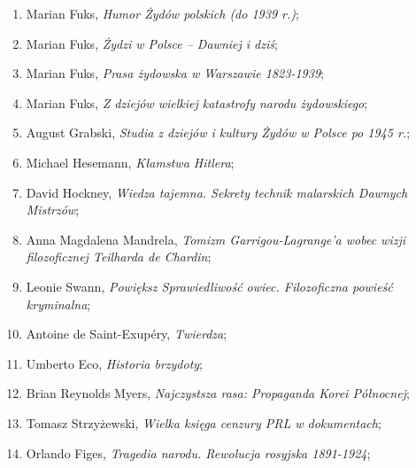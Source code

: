 \documentclass[a4paper,11pt]{article}
\begin{document}
\begin{enumerate}
\item Marian Fuks, \textit{Humor Żydów polskich (do 1939 r.)};



\item Marian Fuks, \textit{Żydzi w Polsce – Dawniej i dziś};



\item Marian Fuks, \textit{Prasa żydowska w Warszawie 1823-1939};



\item Marian Fuks, \textit{Z dziejów wielkiej katastrofy narodu
    żydowskiego};



\item August Grabski, \textit{Studia z dziejów i kultury Żydów w Polsce
    po 1945 r.};



\item Michael Hesemann, \textit{Kłamstwa Hitlera};



\item David Hockney, \textit{Wiedza tajemna. Sekrety technik malarskich
    Dawnych Mistrzów};



\item Anna Magdalena Mandrela, \textit{Tomizm Garrigou-Lagrange’a wobec
    wizji filozoficznej Teilharda de Chardin};



\item Leonie Swann, \textit{Powiększ Sprawiedliwość owiec. Filozoficzna
    powieść kryminalna};



\item Antoine de Saint-Exupéry, \textit{Twierdza};



\item Umberto Eco, \textit{Historia brzydoty};



\item Brian Reynolds Myers, \textit{Najczystsza rasa: Propaganda Korei
    Północnej};



\item Tomasz Strzyżewski, \textit{Wielka księga cenzury PRL w
    dokumentach};



\item Orlando Figes, \textit{Tragedia narodu. Rewolucja rosyjska
    1891-1924};




\end{enumerate}
\end{document}
